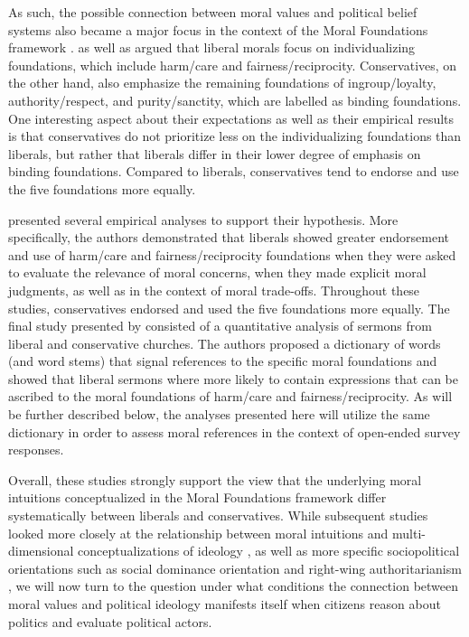 \documentclass[12pt]{article}
\begin{document}
As such, the possible connection between moral values and political belief systems also became a major focus in the context of the Moral Foundations framework \citep[c.f.][]{haidt2012righteous}. \citet{haidt2007morality} as well as \citet{graham2009liberals} argued that liberal morals focus on individualizing foundations, which include harm/care and fairness/reciprocity. Conservatives, on the other hand, also emphasize the remaining foundations of ingroup/loyalty, authority/respect, and purity/sanctity, which are labelled as binding foundations. One interesting aspect about their expectations as well as their empirical results is that conservatives do not prioritize less on the individualizing foundations than liberals, but rather that liberals differ in their lower degree of emphasis on binding foundations. Compared to liberals, conservatives tend to endorse and use the five foundations more equally.

\citet{graham2009liberals} presented several empirical analyses to support their hypothesis. More specifically, the authors demonstrated that liberals showed greater endorsement and use of harm/care and fairness/reciprocity foundations when they were asked to evaluate the relevance of moral concerns, when they made explicit moral judgments, as well as in the context of moral trade-offs. Throughout these studies, conservatives endorsed and used the five foundations more equally. The final study presented by \citet{graham2009liberals} consisted of a quantitative analysis of sermons from liberal and conservative churches. The authors proposed a dictionary of words (and word stems) that signal references to the specific moral foundations and showed that liberal sermons where more likely to contain expressions that can be ascribed to the moral foundations of harm/care and fairness/reciprocity. As will be further described below, the analyses presented here will utilize the same dictionary in order to assess moral references in the context of open-ended survey responses.

Overall, these studies strongly support the view that the underlying moral intuitions conceptualized in the Moral Foundations framework differ systematically between liberals and conservatives. While subsequent studies looked more closely at the relationship between moral intuitions and multi-dimensional conceptualizations of ideology \citep[c.f.][]{haidt2009above}, as well as more specific sociopolitical orientations such as social dominance orientation and right-wing authoritarianism \citep[c.f.][]{federico2013mapping}, we will now turn to the question under what conditions the connection between moral values and political ideology manifests itself when citizens reason about politics and evaluate political actors.
\end{document}
